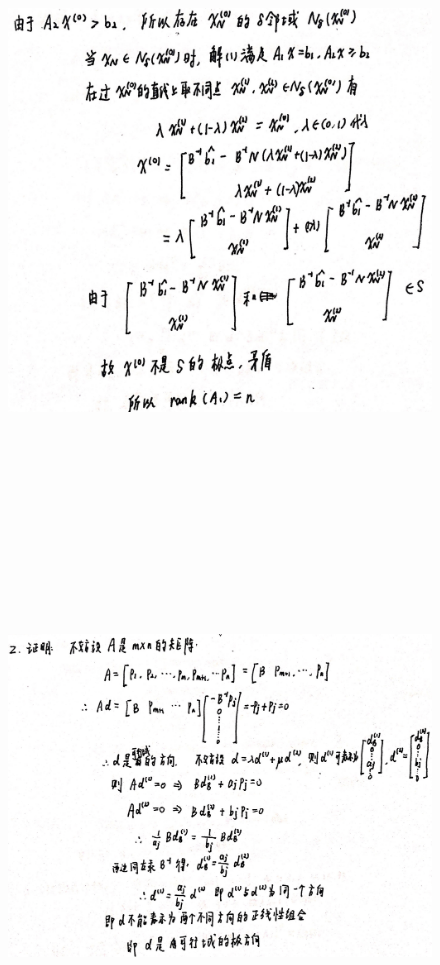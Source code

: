 \documentclass[a4paper]{article}
\begin{document}
\begin{figure}[htbp]
	\centering
	\includegraphics[height=17cm]{img_0332.jpg}
\end{figure}
\begin{figure}[htbp]
	\centering
	\includegraphics[height=13cm]{img_0333.jpg}
\end{figure}
\end{document}
